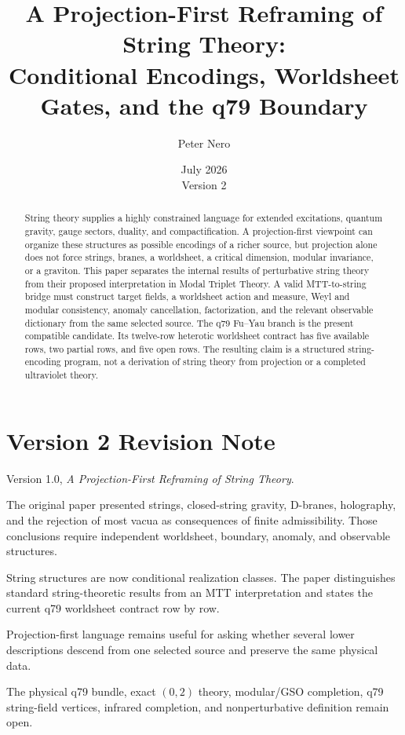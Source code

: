 \documentclass[11pt]{article}
\title{A Projection-First Reframing of String Theory:\\
\large Conditional Encodings, Worldsheet Gates, and the q79 Boundary}
\author{Peter Nero}
\date{July 2026\\Version 2}
\begin{document}
\maketitle

\begin{abstract}
String theory supplies a highly constrained language for extended
excitations, quantum gravity, gauge sectors, duality, and compactification.
A projection-first viewpoint can organize these structures as possible
encodings of a richer source, but projection alone does not force strings,
branes, a worldsheet, a critical dimension, modular invariance, or a
graviton. This paper separates the internal results of perturbative string
theory from their proposed interpretation in Modal Triplet Theory. A valid
MTT-to-string bridge must construct target fields, a worldsheet action and
measure, Weyl and modular consistency, anomaly cancellation, factorization,
and the relevant observable dictionary from the same selected source. The
q79 Fu--Yau branch is the present compatible candidate. Its twelve-row
heterotic worldsheet contract has five available rows, two partial rows, and
five open rows. The resulting claim is a structured string-encoding program,
not a derivation of string theory from projection or a completed ultraviolet
theory.
\end{abstract}

\section*{Version 2 Revision Note}
\begin{description}[leftmargin=3.2cm,style=nextline]
\item[Supersedes] Version 1.0, \emph{A Projection-First Reframing of String
Theory}.
\item[Reason] The original paper presented strings, closed-string gravity,
D-branes, holography, and the rejection of most vacua as consequences of
finite admissibility. Those conclusions require independent worldsheet,
boundary, anomaly, and observable structures.
\item[Resolution] String structures are now conditional realization classes.
The paper distinguishes standard string-theoretic results from an MTT
interpretation and states the current q79 worldsheet contract row by row.
\item[Retained result] Projection-first language remains useful for asking
whether several lower descriptions descend from one selected source and
preserve the same physical data.
\item[Remaining boundary] The physical q79 bundle, exact \((0,2)\) theory,
modular/GSO completion, q79 string-field vertices, infrared completion, and
nonperturbative definition remain open.
\end{description}
\end{document}
